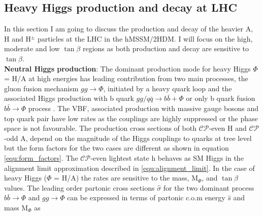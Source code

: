 \subsection{Heavy Higgs production and decay at LHC}\label{subsec:heavy_H_prod_decay}
In this section I am going to discuss the production and decay of the heavier A, H and H$^{\pm}$ particles at the LHC in the hMSSM/2HDM. I will focus on the high, moderate and low $\tan\beta$ regions as both production and decay are sensitive to $\tan\beta$.\\
\textbf{Neutral Higgs production}:\label{neutral_higgs_prod} 
The dominant production mode for heavy Higgs $\Phi$ = H/A at high energies has leading contribution from two main processes, the gluon fusion mechanism $gg\rightarrow \Phi$, initiated by a heavy quark loop and the associated Higgs production with b quark $gg/q\bar{q}\rightarrow b\bar{b} + \Phi$ or only b quark fusion $b\bar{b}\rightarrow \Phi$ process \cite{Djouadi:2015jea}. The VBF, associated production with massive gauge bosons and top quark pair have low rates as the couplings are highly suppressed or the phase space is not favourable. The production cross sections of both $\mathcal{CP}$-even H and $\mathcal{CP}$-odd A, depend on the magnitude of the Higgs couplings to quarks at tree level but the form factors for the two cases are different as shown in equation \ref{equ:form_factors}. The $\mathcal{CP}$-even lightest state h behaves as SM Higgs in the alignment limit approximation described in \ref{equ:alignment_limit}. In the case of heavy Higgs ($\Phi$ = H/A) the rates are sensitive to the mass, M$_{\Phi}$, and $\tan\beta$ values. The leading order partonic cross sections $\hat{\sigma}$ for the two dominant process $b\bar{b}\rightarrow\Phi$ and $gg\rightarrow\Phi$ can be expressed in terms of partonic c.o.m energy $\hat{s}$ and mass M$_{\Phi}$ as

